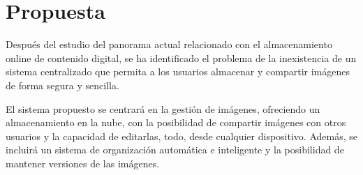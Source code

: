 \section{Propuesta}
Después del estudio del panorama actual relacionado con el almacenamiento online de contenido digital, se ha identificado el problema de la inexistencia de un sistema centralizado que permita a los usuarios almacenar y compartir imágenes de forma segura y sencilla.

El sistema propuesto se centrará en la gestión de imágenes, ofreciendo un almacenamiento en la nube, con la posibilidad de compartir imágenes con otros usuarios y la capacidad de editarlas, todo, desde cualquier dispositivo. Además, se incluirá un sistema de organización automática e inteligente y la posibilidad de mantener versiones de las imágenes.